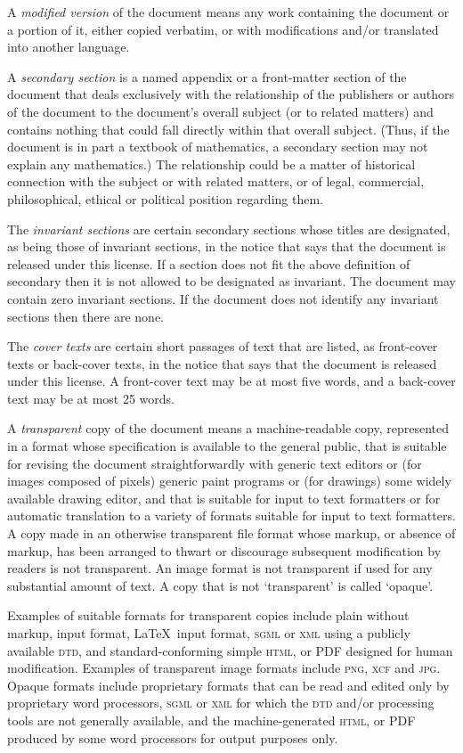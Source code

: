 \begin{multicols}{3}
A \emph{modified version} of the document means any work containing the document or a portion of it, either copied verbatim, or with modifications and\slash or translated into another language.

A \emph{secondary section} is a named appendix or a front-matter section of the document that deals exclusively with the relationship of the publishers or authors of the document to the document's overall subject (or to related matters) and contains nothing that could fall directly within that overall subject. (Thus, if the document is in part a textbook of mathematics, a secondary section may not explain any mathematics.) The relationship could be a matter of historical connection with the subject or with related matters, or of legal, commercial, philosophical, ethical or political position regarding them.

The \emph{invariant sections} are certain secondary sections whose titles are designated, as being those of invariant sections, in the notice that says that the document is released under this license. If a section does not fit the above definition of secondary then it is not allowed to be designated as invariant. The document may contain zero invariant sections. If the document does not identify any invariant sections then there are none.

The \emph{cover texts} are certain short passages of text that are listed, as front-cover texts or back-cover texts, in the notice that says that the document is released under this license. A front-cover text may be at most five words, and a back-cover text may be at most 25 words.

A \emph{transparent} copy of the document means a machine-readable copy, represented in a format whose specification is available to the general public, that is suitable for revising the document straightforwardly with generic text editors or (for images composed of pixels) generic paint programs or (for drawings) some widely available drawing editor, and that is suitable for input to text formatters or for automatic translation to a variety of formats suitable for input to text formatters. A copy made in an otherwise transparent file format whose markup, or absence of markup, has been arranged to thwart or discourage subsequent modification by readers is not transparent. An image format is not transparent if used for any substantial amount of text. A copy that is not \enquote*{transparent} is called \enquote*{opaque}.

\sloppypar Examples of suitable formats for transparent copies include plain \ascii without markup, \texinfo input format, \LaTeX\ input format, \textsc{sgml} or \textsc{xml} using a publicly available \textsc{dtd}, and standard-conforming simple \textsc{html}, \PS or PDF designed for human modification. Examples of transparent image formats include \textsc{png}, \textsc{xcf} and \textsc{jpg}. Opaque formats include proprietary formats that can be read and edited only by proprietary word processors, \textsc{sgml} or \textsc{xml} for which the \textsc{dtd} and\slash or processing tools are not generally available, and the machine-generated \textsc{html}, \PS or PDF produced by some word processors for output purposes only.


\end{multicols}
